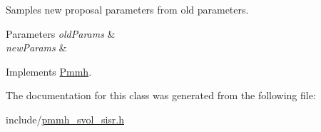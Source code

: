 Samples new proposal parameters from old parameters. 


\begin{DoxyParams}{Parameters}
{\em old\+Params} & \\
\hline
{\em new\+Params} & \\
\hline
\end{DoxyParams}


Implements \hyperlink{classPmmh_a7ada4decd5df894376c74e3ddba5daa1}{Pmmh}.



The documentation for this class was generated from the following file\+:\begin{DoxyCompactItemize}
\item 
include/\hyperlink{pmmh__svol__sisr_8h}{pmmh\+\_\+svol\+\_\+sisr.\+h}\end{DoxyCompactItemize}
